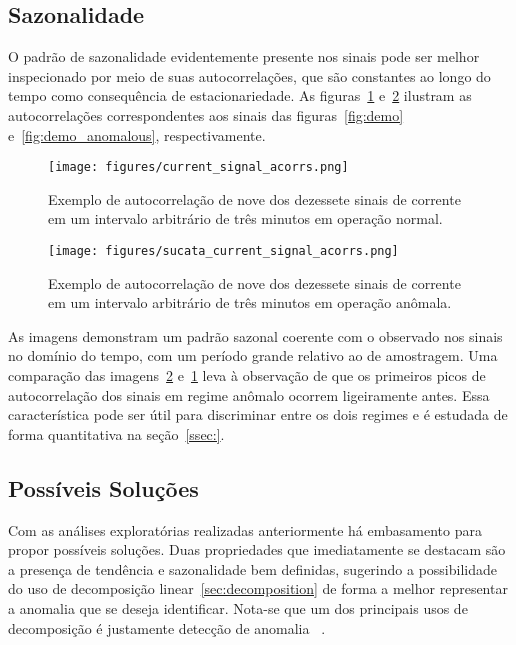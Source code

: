 \subsection{Sazonalidade}

O padrão de sazonalidade evidentemente presente nos sinais pode ser melhor
inspecionado por meio de suas autocorrelações, que são constantes ao longo do
tempo como consequência de estacionariedade. As figuras~\ref{fig:demo_acorrs}
e~\ref{fig:anomalous_demo_acorrs} ilustram as autocorrelações correspondentes
aos sinais das figuras~\ref{fig:demo} e~\ref{fig:demo_anomalous},
respectivamente.

\begin{figure}[H]
    \centering
    \texttt{[image: figures/current\_signal\_acorrs.png]}
    \caption{Exemplo de autocorrelação de nove dos dezessete sinais de corrente
    em um intervalo arbitrário de três minutos em operação normal.}
    \label{fig:demo_acorrs}
\end{figure}

\begin{figure}[H]
    \centering
    \texttt{[image: figures/sucata\_current\_signal\_acorrs.png]}
    \caption{Exemplo de autocorrelação de nove dos dezessete sinais de corrente
    em um intervalo arbitrário de três minutos em operação anômala.}
    \label{fig:anomalous_demo_acorrs}
\end{figure}

As imagens demonstram um padrão sazonal coerente com o observado nos sinais no
domínio do tempo, com um período grande relativo ao de amostragem. Uma
comparação das imagens~\ref{fig:anomalous_demo_acorrs} e~\ref{fig:demo_acorrs}
leva à observação de que os primeiros picos de autocorrelação dos sinais em
regime anômalo ocorrem ligeiramente antes. Essa característica pode ser útil
para discriminar entre os dois regimes e é estudada de forma quantitativa
na seção~\ref{ssec:}.

\subsection{Possíveis Soluções}

Com as análises exploratórias realizadas anteriormente há embasamento para
propor possíveis soluções. Duas propriedades que imediatamente se destacam são
a presença de tendência e sazonalidade bem definidas, sugerindo a possibilidade
do uso de decomposição linear~\ref{sec:decomposition} de forma a melhor
representar a anomalia que se deseja identificar. Nota-se que um dos principais
usos de decomposição é justamente detecção de anomalia
~\cite{anomaly_detection_decomposition}.


